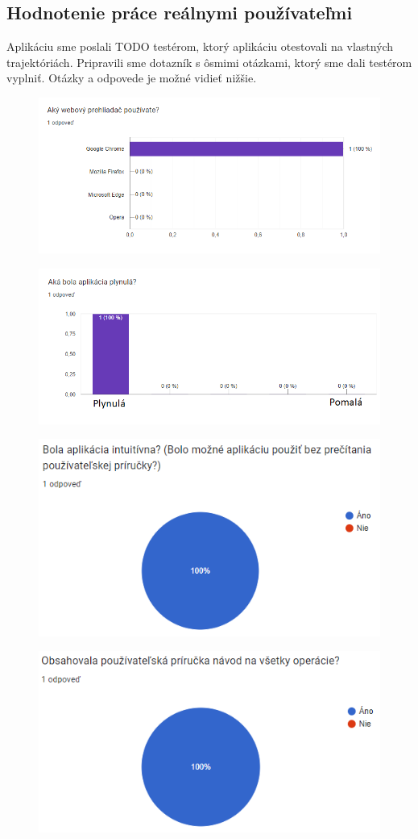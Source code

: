 \subsection{Hodnotenie práce reálnymi používateľmi}
Aplikáciu sme poslali TODO testérom, ktorý aplikáciu otestovali na vlastných trajektóriách. Pripravili sme dotazník s ôsmimi otázkami, ktorý sme dali testérom vyplniť. Otázky a odpovede je možné vidieť nižšie. 
\begin{figure}[H]
  \centering
  \includegraphics[width=.7\textwidth]{img/dotaznik/1.png}
\end{figure}
\begin{figure}[H]
  \centering
  \includegraphics[width=.7\textwidth]{img/dotaznik/2.png}
\end{figure}
\begin{figure}[H]
  \centering
  \includegraphics[width=.7\textwidth]{img/dotaznik/3.png}
\end{figure}
\begin{figure}[H]
  \centering
  \includegraphics[width=.7\textwidth]{img/dotaznik/4.png}
\end{figure}
